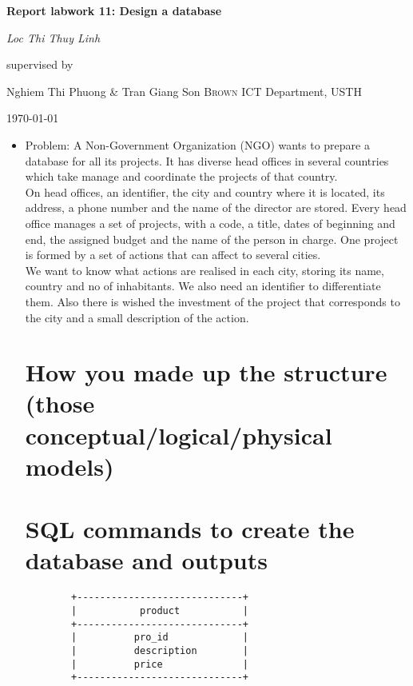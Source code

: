 \documentclass[13pt,a4paper]{report}
\begin{document}
\begin{titlepage}
	\centering
	\vspace{2cm}
	{\huge\bfseries Report labwork 11: Design a database \par}
	\vspace{2cm}
	{\Large\itshape Loc Thi Thuy Linh\par}
	\vfill
	supervised by\par
	Nghiem Thi Phuong \& Tran Giang Son \textsc{Brown}
	ICT Department, USTH\par
	\vfill
	{\large \today\par}
\end{titlepage}

\begin{itemize}

\item Problem:
\indent A Non-Government Organization (NGO) wants to prepare a database for
all its projects. It has diverse head offices in several countries which take
manage and coordinate the projects of that country.
\\
\indent On head offices, an identifier, the city and country where it is located, its
address, a phone number and the name of the director are stored. Every
head office manages a set of projects, with a code, a title, dates of beginning
and end, the assigned budget and the name of the person in charge. One
project is formed by a set of actions that can affect to several cities.
\\
\indent We want to know what actions are realised in each city, storing its name,
country and no of inhabitants. We also need an identifier to differentiate
them. Also there is wished the investment of the project that corresponds to
the city and a small description of the action.


\section{ How you made up the structure (those conceptual/logical/physical models) }


\section{ SQL commands to create the database and outputs }

\begin{lstlisting}
		+-----------------------------+
		|           product           |
		+-----------------------------+
		|          pro_id             |
		|          description        |
		|          price              |
		+-----------------------------+

		

\end{lstlisting}




\end{itemize}
\end{document}
